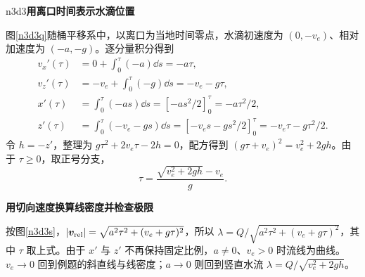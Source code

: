 \begin{drillsolution}{n3d3}\textbf{用离口时间表示水滴位置}\par\nobreak
图\ref{n3d3q}随桶平移系中，以离口为当地时间零点，水滴初速度为 $(0,-v_e)$、相对加速度为 $(-a,-g)$。逐分量积分得到
\begin{align*}
 v_x'(\tau)&=0+\int_0^\tau(-a)\dd s=-a\tau,\\
 v_z'(\tau)&=-v_e+\int_0^\tau(-g)\dd s=-v_e-g\tau,\\
 x'(\tau)&=\int_0^\tau(-as)\dd s
 =[-as^2/2]_0^\tau=-a\tau^2/2,\\
 z'(\tau)&=\int_0^\tau(-v_e-gs)\dd s
 =[-v_es-gs^2/2]_0^\tau=-v_e\tau-g\tau^2/2.
\end{align*}
令 $h=-z'$，整理为 $g\tau^2+2v_e\tau-2h=0$，配方得到 $(g\tau+v_e)^2=v_e^2+2gh$。由于 $\tau\ge0$，取正号分支，
\[\tau=\frac{\sqrt{v_e^2+2gh}-v_e}{g}.\]


\par\medskip{}\noindent\textbf{用切向速度换算线密度并检查极限}\par\nobreak
按图\ref{n3d3s}，$|\bm v_{\rm rel}|=\sqrt{a^2\tau^2+(v_e+g\tau)^2}$，所以 $\lambda=Q/\sqrt{a^2\tau^2+(v_e+g\tau)^2}$，其中 $\tau$ 取上式。由于 $x'$ 与 $z'$ 不再保持固定比例，$a\ne0$、$v_e>0$ 时流线为曲线。$v_e\to0$ 回到例题的斜直线与线密度；$a\to0$ 则回到竖直水流 $\lambda=Q/\sqrt{v_e^2+2gh}$。
\end{drillsolution}


